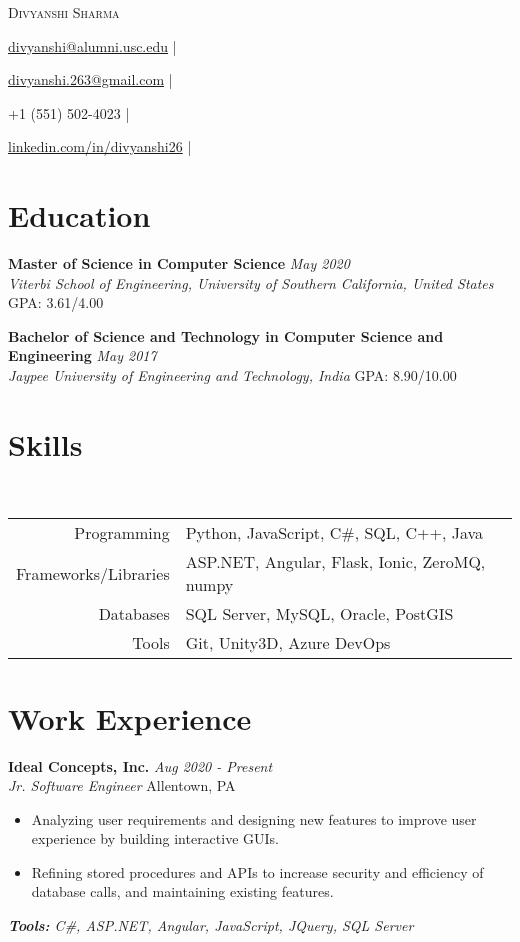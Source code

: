 \documentclass[letterpaper,10pt]{article}
\newcommand{\organization}[4]{
    \vspace{1.5pt}
    \textbf{#1} \hfill{\emph{#2}} \\
    \emph{#3} \hfill{#4} \\
    \vspace{3pt}
}
\newcommand{\toolsused}[1]{
    \vspace{1.5pt}
    \emph{#1}\\
    \vspace{3pt}
}
\newcommand{\skills}[4]{
    \vspace{-2pt}
    \ \ \ \ \ \ \ \ \ \ \ 
    \begin{tabular}{r!{\color{burgundy}\vrule}l}
          Programming & #1 \\
          Frameworks/Libraries & #2 \\
          Databases & #3 \\
          Tools & #4
    \end{tabular}
    \vspace{4pt}
}
\newcommand{\bulletsBegin}{
    \vspace{1pt}
    \begin{minipage}{17.6cm}
    \begin{itemize}[leftmargin=0.6cm]
    \setlength\itemsep{-0.1em}
}
\newcommand{\bulletsEnd}{
    \end{itemize}\vspace{0pt}
    \end{minipage}
}
\newcommand{\myEmail}[1]{
    \href{mailto:#1}{#1} |
}
\newcommand{\myPhone}[1]{
    {#1} |
}
\newcommand{\mySite}[1]{
    \href{https://linkedin.com/in/divyanshi26}{#1} |
}
\newcommand{\myName}[5]{
    \begin{center}
        {\huge{\color{burgundy}\scshape{#1}}} \\
        \vspace{6pt}
        \myEmail{#2}
        \myEmail{#3}
        \myPhone{#4}
        \mySite{#5}
    \end{center}
    \vspace{-4pt}
}
\begin{document}
    \myName{Divyanshi Sharma}{divyanshi@alumni.usc.edu}{divyanshi.263@gmail.com}{+1 (551) 502-4023}{linkedin.com/in/divyanshi26}

    \section{Education}
        
    \organization{Master of Science in Computer Science}{May 2020}
        {Viterbi School of Engineering, University of Southern California, United States}{GPA: 3.61/4.00}

	\organization{Bachelor of Science and Technology in Computer Science and Engineering}{May 2017}
        {Jaypee University of Engineering and Technology, India}{GPA: 8.90/10.00}
	\vspace{6pt}
    
    \section{Skills}
    
    \skills
        {Python, JavaScript, C\#, SQL, C++, Java}  %
        {ASP.NET, Angular, Flask, Ionic, ZeroMQ, numpy}  %
        {SQL Server, MySQL, Oracle, PostGIS}  %
        {Git, Unity3D, Azure DevOps}  %

    \section{Work Experience}
    
    	\organization{Ideal Concepts, Inc.}{Aug 2020 - Present}
        {Jr. Software Engineer}{Allentown, PA}
        \bulletsBegin
            \item Analyzing user requirements and designing new features to improve user experience by building interactive GUIs.
            \vspace{-2pt}
            \item Refining stored procedures and APIs to increase security and efficiency of database calls, and maintaining existing features.
            \vspace{-2pt}
        \bulletsEnd
        \vspace{-4pt}
        \toolsused{\textbf{Tools:} C\#, ASP.NET, Angular, JavaScript, JQuery, SQL Server}
\end{document}
